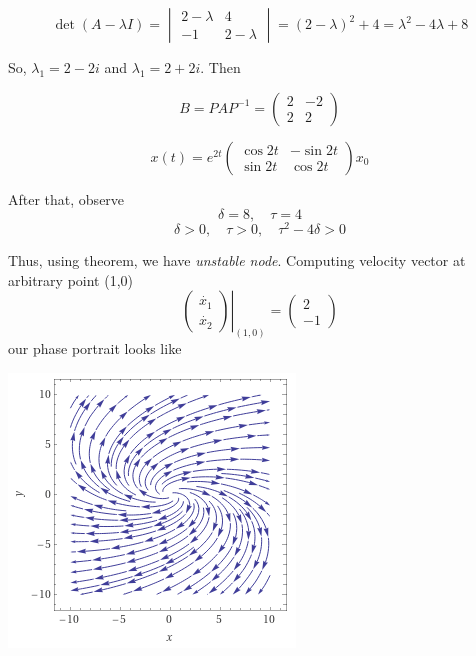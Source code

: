 \documentclass[12pt]{article}
\begin{document}
    $$
        \det (A - \lambda I) = 
        \begin{vmatrix}
            2-\lambda & 4\\
            -1 & 2-\lambda
        \end{vmatrix}
        = (2-\lambda)^2+4
        =\lambda^2 -4\lambda +8
    $$

    So, $\lambda_1 = 2-2i$ and $\lambda_1 = 2+2i$.
    Then
    
    $$
        B = PAP^{-1} =
        \begin{pmatrix}
            2 & -2\\
            2 & 2
        \end{pmatrix}
    $$
    
    $$
        x(t) = e^{2t}
        \begin{pmatrix}
            \cos 2t & -\sin 2t\\
            \sin 2t & \cos 2t
        \end{pmatrix}
        x_0
    $$

    After that, observe
    $$
        \delta = 8,\quad\tau = 4
    $$
    $$
        \delta>0,\quad\tau > 0,\quad
        \tau^2-4\delta>0
    $$

    Thus, using theorem, we have \textit{unstable node}.
    Computing velocity vector at arbitrary point (1,0)
    $$  
        \left.
        \begin{pmatrix}
            \dot{x_1}\\
            \dot{x_2}
        \end{pmatrix}
        \right\vert_{(1,0)} =
        \begin{pmatrix}
            2\\
            -1
        \end{pmatrix}
    $$
    our phase portrait looks like
    
    \begin{center}
        \includegraphics{plot2.png}
    \end{center}
\end{document}
